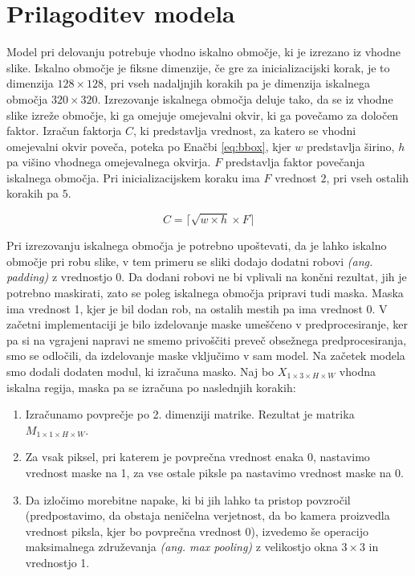 \documentclass[a4paper,12pt,openright]{book}
\begin{document}
\section{Prilagoditev modela}
\label{sec:model_mod}
Model pri delovanju potrebuje vhodno iskalno območje, ki je izrezano iz vhodne slike. Iskalno območje je fiksne dimenzije, če gre za inicializacijski korak, je to dimenzija $128 \times 128$, pri vseh nadaljnjih korakih pa je dimenzija iskalnega območja $ 320 \times 320 $. Izrezovanje iskalnega območja deluje tako, da se iz vhodne slike izreže območje, ki ga omejuje omejevalni okvir, ki ga povečamo za določen faktor. Izračun faktorja $C$, ki predstavlja vrednost, za katero se vhodni omejevalni okvir poveča, poteka po Enačbi \ref{eq:bbox}, kjer $w$ predstavlja širino, $h$ pa višino vhodnega omejevalnega okvirja. $F$ predstavlja faktor povečanja iskalnega območja. Pri inicializacijskem koraku ima $F$ vrednost $2$, pri vseh ostalih korakih pa $5$.

\begin{equation}
    C = \lceil{\sqrt{w \times h} \times F} \rceil
    \label{eq:bbox}
\end{equation}


Pri izrezovanju iskalnega območja je potrebno upoštevati, da je lahko iskalno območje pri robu slike, v tem primeru se sliki dodajo dodatni robovi \emph{(ang. padding)} z vrednostjo 0. Da dodani robovi ne bi vplivali na končni rezultat, jih je potrebno maskirati, zato se poleg iskalnega območja pripravi tudi maska. Maska ima vrednost 1, kjer je bil dodan rob, na ostalih mestih pa ima vrednost 0. V začetni implementaciji je bilo izdelovanje maske umeščeno v predprocesiranje, ker pa si na vgrajeni napravi ne smemo privoščiti preveč obsežnega predprocesiranja, smo se odločili, da izdelovanje maske vključimo v sam model. Na začetek modela smo dodali dodaten modul, ki izračuna masko. Naj bo $ X_{1 \times 3 \times H \times W} $ vhodna iskalna regija, maska pa se izračuna po naslednjih korakih:

\begin{enumerate}
    \item Izračunamo povprečje po 2. dimenziji matrike. Rezultat je matrika $ M_{1 \times 1 \times H \times W} $.
    \item Za vsak piksel, pri katerem je povprečna vrednost enaka 0, nastavimo vrednost maske na 1, za vse ostale piksle pa nastavimo vrednost maske na 0.
    \item Da izločimo morebitne napake, ki bi jih lahko ta pristop povzročil (predpostavimo, da obstaja neničelna verjetnost, da bo kamera proizvedla vrednost piksla, kjer bo povprečna vrednost 0), izvedemo še operacijo maksimalnega združevanja \emph{(ang. max pooling)} z velikostjo okna $ 3 \times 3 $ in vrednostjo 1.
\end{enumerate}
\end{document}
